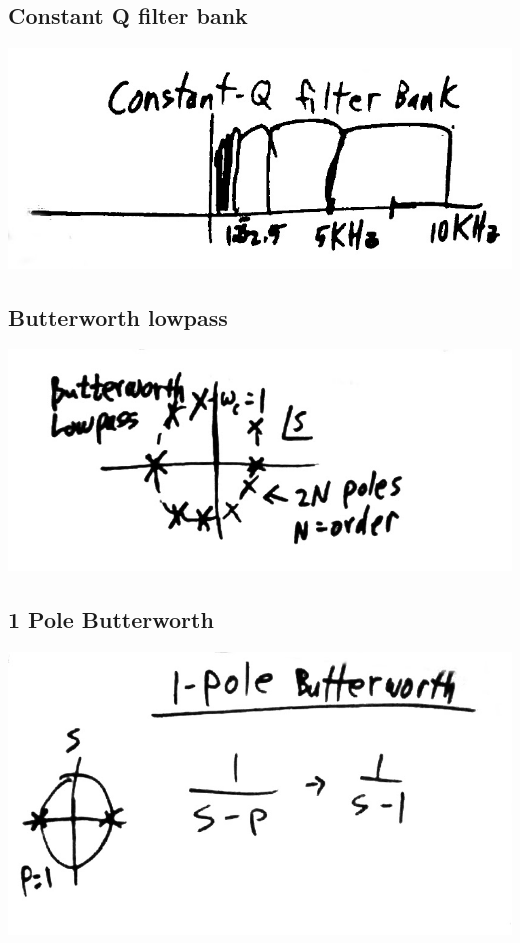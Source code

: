 \subsection*{Constant Q filter bank}

\includegraphics[scale=0.3]{photos/jan26/11d}


\subsection*{Butterworth lowpass}

\includegraphics[scale=0.3]{photos/jan26/11e}


\subsection*{1 Pole Butterworth}

\includegraphics[scale=0.3]{photos/jan26/11f}


